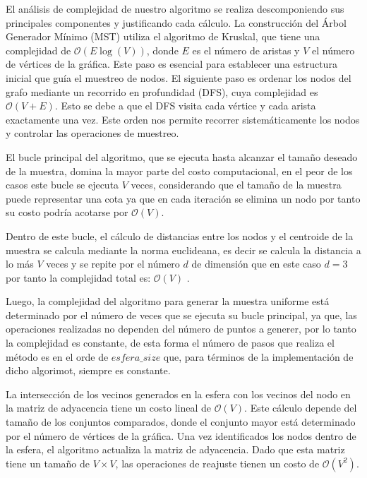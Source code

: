 El análisis de complejidad de nuestro algoritmo se realiza descomponiendo sus principales componentes y justificando cada cálculo. La construcción del Árbol Generador Mínimo (MST) utiliza el algoritmo de Kruskal, que tiene una complejidad de \( \mathcal{O}(E \log(V)) \)\cite{Introduction-toalgorithm}, donde \( E \) es el número de aristas y \( V \) el número de vértices de la gráfica. Este paso es esencial para establecer una estructura inicial que guía el muestreo de nodos.
El siguiente paso es ordenar los nodos del grafo mediante un recorrido en profundidad (DFS), cuya complejidad es \( \mathcal{O}(V + E) \)\cite{Introduction-toalgorithm}. Esto se debe a que el DFS visita cada vértice y cada arista exactamente una vez. Este orden nos permite recorrer sistemáticamente los nodos y controlar las operaciones de muestreo.

El bucle principal del algoritmo, que se ejecuta hasta alcanzar el tamaño deseado de la muestra, domina la mayor parte del costo computacional, en el peor de los casos este bucle se ejecuta \(V\) veces, considerando que el tamaño de la muestra puede representar una cota ya que en cada iteración se elimina un nodo por tanto su costo podría acotarse por \(\mathcal{O} (V)\). 

Dentro de este bucle, el cálculo de distancias entre los nodos y el centroide de la muestra se calcula mediante la norma euclideana, es decir se calcula la distancia a lo más $V$ veces y se repite por el número $d$ de dimensión que en este caso $d=3$ por tanto la complejidad total es: $\mathcal{O}(V)$ .

Luego, la complejidad del algoritmo para generar la muestra uniforme está determinado por el número de veces que se ejecuta su bucle principal, ya que, las operaciones realizadas no dependen del número de puntos a generer, por lo tanto la complejidad es constante, de esta forma el número de pasos que realiza el método es en el orde de $esfera\_size$ que, para términos de la implementación de dicho algorimot, siempre es constante.

La intersección de los vecinos generados en la esfera con los vecinos del nodo en la matriz de adyacencia tiene un costo lineal de \( \mathcal{O}(V) \). Este cálculo depende del tamaño de los conjuntos comparados, donde el conjunto mayor está determinado por el número de vértices de la gráfica. Una vez identificados los nodos dentro de la esfera, el algoritmo actualiza la matriz de adyacencia. Dado que esta matriz tiene un tamaño de \( V \times V \), las operaciones de reajuste tienen un costo de \( \mathcal{O}(V^2) \).

